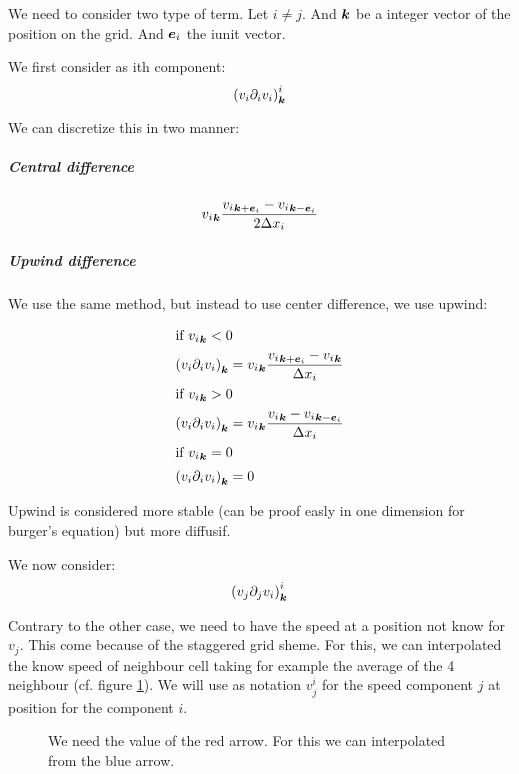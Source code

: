 We need to consider two type of term. Let $i\neq j$. And ${\boldsymbol {k}}$ be a integer vector of the position on the grid.
And ${\boldsymbol {e}}_i$ the i\th unit vector.

We first consider as ith component:
\begin{equation}
\left(v_{i}\partial_{i}v_{i}\right)^{i}_{{\boldsymbol {k}}}
\end{equation}

We can discretize this in two manner:

\subparagraph{Central difference}
\begin{equation}
{v_{i}}_{{\boldsymbol {k}}}\frac{{v_{i}}_{{\boldsymbol {k}}+{\boldsymbol {e}}_i}-{v_{i}}_{{\boldsymbol {k}}-{\boldsymbol {e}}_i}}{2\Delta x_{i}}
\end{equation}

\subparagraph{Upwind difference}

We use the same method, but instead to use center difference, we use upwind:

\begin{align}
\intertext{if ${v_{i}}_{{\boldsymbol {k}}}<0$}
\left(v_{i}\partial_{i}v_{i}\right)_{{\boldsymbol {k}}}&={v_{i}}_{{\boldsymbol {k}}}\frac{{v_{i}}_{{\boldsymbol {k}}+{\boldsymbol {e}}_i}-{v_{i}}_{{\boldsymbol {k}}}}{\Delta x_{i}}\\
\intertext{if ${v_{i}}_{{\boldsymbol {k}}}>0$}
\left(v_{i}\partial_{i}v_{i}\right)_{{\boldsymbol {k}}}&={v_{i}}_{{\boldsymbol {k}}}\frac{{v_{i}}_{{\boldsymbol {k}}}-{v_{i}}_{{\boldsymbol {k}}-{\boldsymbol {e}}_i}}{\Delta x_{i}}\\
\intertext{if ${v_{i}}_{{\boldsymbol {k}}}=0$}
\left(v_{i}\partial_{i}v_{i}\right)_{{\boldsymbol {k}}}&=0
\end{align}

Upwind is considered more stable (can be proof easly in one dimension for burger's equation) but more diffusif.

We now consider:
\begin{equation}
\left(v_{j}\partial_{j}v_{i}\right)^{i}_{{\boldsymbol {k}}}
\end{equation}

\begin{remark}
  Contrary to the other case, we need to have the speed at a position not know for $v_{j}$. This come because of the staggered grid sheme.
  For this, we can interpolated the know speed of neighbour cell taking for example the average of the 4 neighbour (cf. figure \ref{fixed:staggered_convection_upwind}).
  We will use as notation $v_{j}^{i}$ for the speed component $j$ at position for the component $i$.
  
  \begin{figure}
    \caption{We need the value of the red arrow. For this we can interpolated from the blue arrow.}
    \label{fixed:staggered_convection_upwind}
    \end{figure}
\end{remark}

